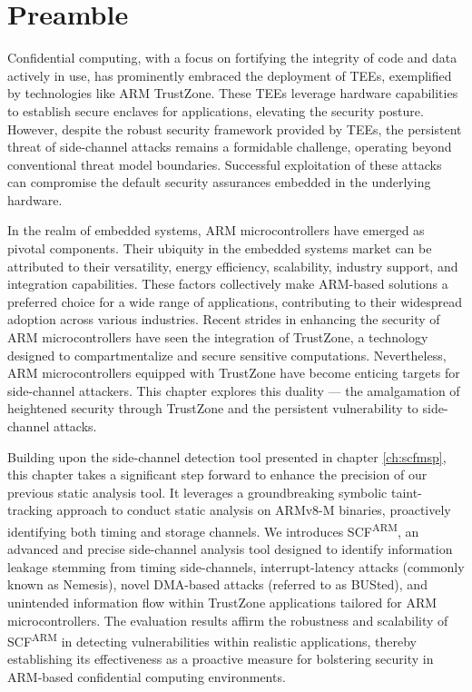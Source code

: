 
\section*{Preamble}

Confidential computing, with a focus on fortifying the integrity of code
and data actively in use, has prominently embraced the deployment of
\acp{TEE}, exemplified by technologies like ARM TrustZone. These
\acp{TEE} leverage hardware capabilities to establish secure enclaves for
applications, elevating the security posture. However, despite the robust
security framework provided by \acp{TEE}, the persistent threat of
side-channel attacks remains a formidable challenge, operating beyond
conventional threat model boundaries. Successful exploitation of these
attacks can compromise the default security assurances embedded in the
underlying hardware.

In the realm of embedded systems, ARM microcontrollers have emerged as
pivotal components. Their ubiquity in the embedded systems market can be
attributed to their versatility, energy efficiency, scalability, industry
support, and integration capabilities. These factors collectively make
ARM-based solutions a preferred choice for a wide range of applications,
contributing to their widespread adoption across various industries. Recent
strides in enhancing the security of ARM microcontrollers have seen the
integration of TrustZone, a technology designed to compartmentalize and
secure sensitive computations. Nevertheless, ARM microcontrollers equipped
with TrustZone have become enticing targets for side-channel attackers.
This chapter explores this duality — the amalgamation of heightened
security through TrustZone and the persistent vulnerability to side-channel
attacks.

Building upon the side-channel detection tool presented in chapter
\ref{ch:scfmsp}, this chapter takes a significant step forward to enhance
the precision of our previous static analysis tool. It leverages a
groundbreaking symbolic taint-tracking approach to conduct static analysis
on ARMv8-M binaries, proactively identifying both timing and storage
channels. We introduces \ac{SCF}\textsuperscript{ARM}, an advanced and
precise side-channel analysis tool designed to identify information leakage
stemming from timing side-channels, interrupt-latency attacks (commonly
known as Nemesis), novel DMA-based attacks (referred to as BUSted), and
unintended information flow within TrustZone applications tailored for ARM
microcontrollers.  The evaluation results affirm the robustness and
scalability of \ac{SCF}\textsuperscript{ARM} in detecting vulnerabilities
within realistic applications, thereby establishing its effectiveness as a
proactive measure for bolstering security in ARM-based confidential
computing environments.

